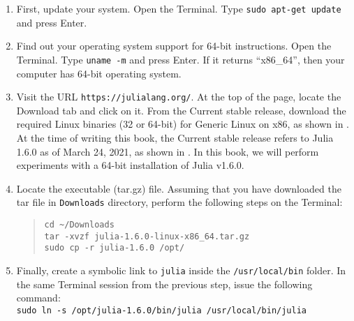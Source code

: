 \begin{enumerate}
      \item First, update your system. Open the Terminal. Type
                  {\tt sudo apt-get update} and press Enter. 
      \item Find out your operating system support for 64-bit
            instructions. Open the Terminal. Type {\tt uname -m} and press Enter. If it returns ``x86\_64'', then your computer has 64-bit
            operating system. 
      \item Visit the URL {\tt https://julialang.org/}.  At the top of the page, 
      locate the Download tab and click on it. From the Current stable release, download the 
            required Linux binaries (32 or 64-bit) for Generic Linux on x86, as shown in .  
            At the time of writing this book, the Current stable release refers to Julia 1.6.0 as of March 24, 2021, 
            as shown in  . In this book, we will perform experiments with a 64-bit installation of Julia  v1.6.0. 
      \item Locate the executable (tar.gz) file. Assuming that you have downloaded the tar file in {\tt Downloads} directory, perform the following
            steps on the Terminal:
            \begin{quote}
                  {\tt cd {\large\textasciitilde}/Downloads\\
                        tar -xvzf julia-1.6.0-linux-x86\_64.tar.gz\\
                        sudo cp -r julia-1.6.0 /opt/}
            \end{quote}
      \item Finally, create a symbolic link to {\tt julia} inside the
            {\tt /usr/local/bin} folder. In the same Terminal session from the previous step, issue the 
            following command: \\
            {\tt sudo ln -s /opt/julia-1.6.0/bin/julia /usr/local/bin/julia} 
\end{enumerate}


